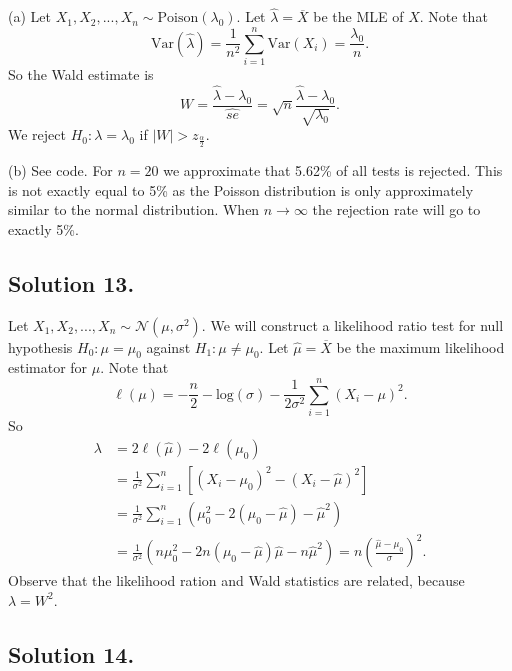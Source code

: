 (a) Let $X_1, X_2, ..., X_n \sim \mathrm{Poison}(\lambda_0)$.
Let $\hat{\lambda} = \overline{X}$ be the MLE of $X$.
Note that
$$
\mathrm{Var}(\hat{\lambda}) = \frac{1}{n^2} \sum_{i=1}^n \mathrm{Var}(X_i) = \frac{\lambda_0}{n}.
$$
So the Wald estimate is
$$
W = \frac{\hat{\lambda} - \lambda_0}{\hat{se}} = \sqrt{n} \frac{\hat{\lambda} - \lambda_0}{\sqrt{\lambda_0}}.
$$
We reject $H_0: \lambda = \lambda_0$ if $|W| > z_{\frac{\alpha}{2}}$.

(b) See code.
For $n = 20$ we approximate that 5.62\% of all tests is rejected.
This is not exactly equal to 5\% as the Poisson distribution is only approximately similar to the normal distribution.
When $n \to \infty$ the rejection rate will go to exactly 5\%.


\subsection*{Solution 13.}

Let $X_1, X_2, ..., X_n \sim \mathcal{N}(\mu, \sigma^2)$.
We will construct a likelihood ratio test for null hypothesis $H_0: \mu = \mu_0$ against $H_1: \mu \neq \mu_0$.
Let $\hat{\mu} = \overline{X}$ be the maximum likelihood estimator for $\mu$.
Note that
$$
\ell(\mu) = -\frac{n}{2} - \mathrm{log}(\sigma) - \frac{1}{2\sigma^2} \sum_{i=1}^n (X_i - \mu)^2.
$$
So
\begin{equation*}
\begin{split}
\lambda &= 2\ell(\hat{\mu}) - 2\ell(\mu_0) \\
    &= \frac{1}{\sigma^2} \sum_{i=1}^n \left[ (X_i - \mu_0)^2 - (X_i - \hat{\mu})^2 \right] \\
    &= \frac{1}{\sigma^2} \sum_{i=1}^n (\mu_0^2 - 2(\mu_0 - \hat{\mu}) - \hat{\mu}^2) \\
    &= \frac{1}{\sigma^2} (n\mu_0^2 - 2n(\mu_0 - \hat{\mu})\hat{\mu} - n\hat{\mu}^2)
    = n \left(\frac{\hat{\mu} - \mu_0}{\sigma}\right)^2.
\end{split}
\end{equation*}
Observe that the likelihood ration and Wald statistics are related, because $\lambda = W^2$.


\subsection*{Solution 14.}

